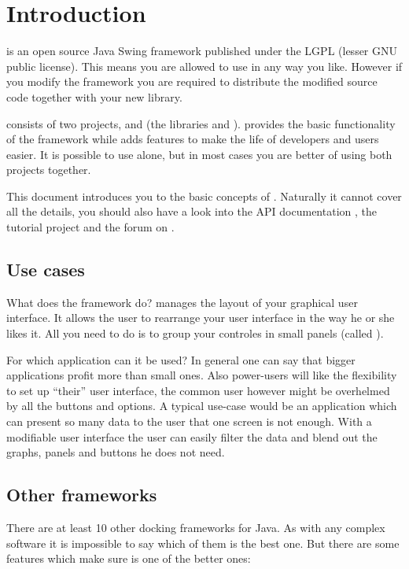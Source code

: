 \section{Introduction}
 is an open source Java Swing framework published under the LGPL (lesser GNU public license). This means you are allowed to use \linebreak {} in any way you like. However if you modify the framework you are required to distribute the modified source code together with your new library.

 consists of two projects,  and  (the libraries  and ).  provides the basic functionality of the framework while  adds features to make the life of developers and users easier. It is possible to use  alone, but in most cases you are better of using both projects together.

This document introduces you to the basic concepts of . Naturally it cannot cover all the details, you should also have a look into the API documentation \linebreak {}, the tutorial project and the forum on \linebreak {}.

\subsection{Use cases}
What does the framework do?  manages the layout of your graphical user interface. It allows the user to rearrange your user interface in the way he or she likes it. All you need to do is to group your controles in small panels (called ).

For which application can it be used? In general one can say that bigger applications profit more than small ones. Also power-users will like the flexibility to set up ``their'' user interface, the common user however might be overhelmed by all the buttons and options. A typical use-case would be an application which can present so many data to the user that one screen is not enough. With a modifiable user interface the user can easily filter the data and blend out the graphs, panels and buttons he does not need.

\subsection{Other frameworks}
There are at least 10 other docking frameworks for Java. As with any complex software it is impossible to say which of them is the best one. But there are some features which make sure  is one of the better ones:

